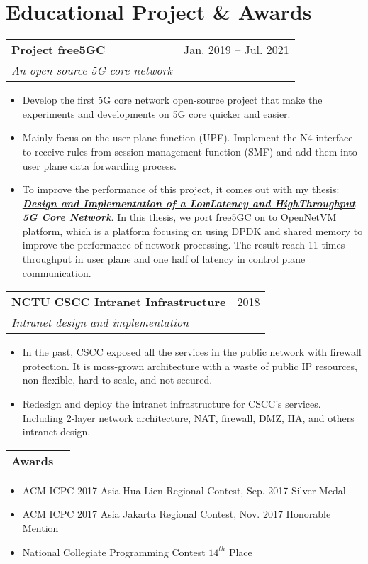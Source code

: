\documentclass[letterpaper,11pt]{article}
\makeatletter
\newcommand{\resumeItemTwo}[1]{
  \item\small{
    {#1 \vspace{-2pt}}
  }
}
\newcommand{\resumeSubheading}[4]{
  \vspace{1pt}%
    \begin{tabular*}{0.97\textwidth}{l@{\extracolsep{\fill}}r}
      \textbf{#1} & #2 \\
      \textit{\small#3} & \textit{\small #4} \\
    \end{tabular*}\vspace{-5pt}
}
\newcommand{\resumeSubheadingOne}[2]{
  \vspace{-1pt}%
    \begin{tabular*}{0.97\textwidth}{l@{\extracolsep{\fill}}r}
      \textbf{#1} & #2 \\
    \end{tabular*}\vspace{-5pt}
}
\newcommand{\resumeSubHeadingListStart}{}%
\newcommand{\resumeSubHeadingListEnd}{}%
\newcommand{\resumeItemListStart}{\begin{itemize}}
\newcommand{\resumeItemListEnd}{\end{itemize}\vspace{-5pt}}
\makeatother
\begin{document}
\section{Educational Project \& Awards}
  \resumeSubHeadingListStart
    \resumeSubheading
     {Project \href{https://www.free5gc.org/}{free5GC}}{Jan. 2019 -- Jul. 2021}
      {An open-source 5G core network}{}
      \resumeItemListStart
        \resumeItemTwo{Develop the first 5G core network open-source project that make the experiments and developments on 5G core quicker and easier.}
        \resumeItemTwo{Mainly focus on the user plane function (UPF). Implement the N4 interface to receive rules from session management function (SMF) and add them into user plane data forwarding process.}
        \resumeItemTwo{To improve the performance of this project, it comes out with my thesis: \textbf{\textit{\href{https://hdl.handle.net/11296/44vnys}{Design and Implementation of a Low­Latency and High­Throughput 5G Core Network}}}. In this thesis, we port free5GC on to \href{http://sdnfv.github.io/onvm/}{OpenNetVM} platform, which is a platform focusing on using DPDK and shared memory to improve the performance of network processing. The result reach 11 times throughput in user plane and one half of latency in control plane communication.}
      \resumeItemListEnd
    \resumeSubheading
     {NCTU CSCC Intranet Infrastructure}{2018}
      {Intranet design and implementation}{}
      \resumeItemListStart
        \resumeItemTwo{In the past, CSCC exposed all the services in the public network with firewall protection. It is moss-grown architecture with a waste of public IP resources, non-flexible, hard to scale, and not secured.}
        \resumeItemTwo{Redesign and deploy the intranet infrastructure for CSCC's services. Including 2-layer network architecture, NAT, firewall, DMZ, HA, and others intranet design.}
      \resumeItemListEnd
    \resumeSubheadingOne
     {Awards}{}
      \resumeItemListStart
        \resumeItemTwo{ACM ICPC 2017 Asia Hua-Lien Regional Contest, Sep. 2017}{Silver Medal}
        \resumeItemTwo{ACM ICPC 2017 Asia Jakarta Regional Contest, Nov. 2017}{Honorable Mention}
        \resumeItemTwo{National Collegiate Programming Contest}{$14^{th}$ Place}
      \resumeItemListEnd
  \resumeSubHeadingListEnd
\end{document}
